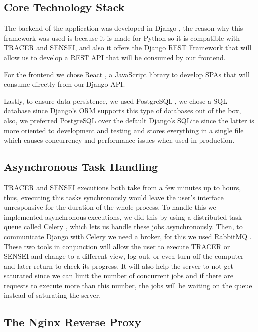 \subsection{Core Technology Stack}

The backend of the application was developed in Django \autocite{Django},
the reason why this framework was used is because it is made for Python
so it is compatible with \ac{TRACER} and SENSEI,
and also it offers the Django REST Framework \autocite{DjangoRESTFramework}
that will allow us to develop a \ac{REST} \ac{API} that will be consumed by our frontend.

For the frontend we chose React \autocite{React},
a JavaScript library to develop \acp{SPA}
that will consume directly from our Django \ac{API}.

Lastly, to ensure data persistence,
we used PostgreSQL \autocite{PostgreSQL2025},
we chose a \ac{SQL} database since Django's \ac{ORM} supports this type of databases out of the box,
also, we preferred PostgreSQL over the default Django's SQLite
since the latter is more oriented to development and testing
and stores everything in a single file which causes concurrency and performance issues when used in production.

\subsection{Asynchronous Task Handling}

\ac{TRACER} and SENSEI executions both take from a few minutes up to hours,
thus, executing this tasks synchronously would leave the user's interface unresponsive
for the duration of the whole process.
To handle this we implemented asynchronous executions,
we did this by using a distributed task queue called Celery \autocite{Celery},
which lets us handle these jobs asynchronously.
Then, to communicate Django with Celery we need a broker,
for this we used RabbitMQ \autocite{RabbitMQ}.
These two tools in conjunction will allow the user to execute \ac{TRACER} or SENSEI
and change to a different view, log out, or even turn off the computer
and later return to check its progress.
It will also help the server to not get saturated
since we can limit the number of concurrent jobs
and if there are requests to execute more than this number,
the jobs will be waiting on the queue instead of saturating the server.


\subsection{The Nginx Reverse Proxy}

